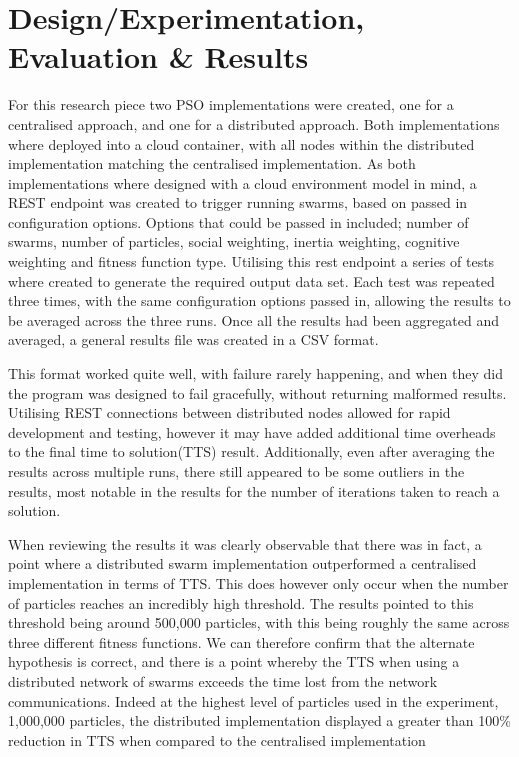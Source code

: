 \documentclass[oneside,12pt]{book}
\begin{document}
\section{Design/Experimentation, Evaluation \& Results}
For this research piece two PSO implementations were created, one for a centralised approach, and one for a distributed approach. Both implementations where deployed into a cloud container, with all nodes within the distributed implementation matching the centralised implementation. As both implementations where designed with a cloud environment model in mind, a REST endpoint was created to trigger running swarms, based on passed in configuration options. Options that could be passed in included; number of swarms, number of particles, social weighting, inertia weighting, cognitive weighting and fitness function type. Utilising this rest endpoint a series of tests where created to generate the required output data set. Each test was repeated three times, with the same configuration options passed in, allowing the results to be averaged across the three runs. 
Once all the results had been aggregated and averaged, a general results file was created in a CSV format. 

This format worked quite well, with failure rarely happening, and when they did the program was designed to fail gracefully, without returning malformed results. Utilising REST connections between distributed nodes allowed for rapid development and testing, however it may have added additional time overheads to the final time to solution(TTS) result. Additionally, even after averaging the results across multiple runs, there still appeared to be some outliers in the results, most notable in the results for the number of iterations taken to reach a solution. 

When reviewing the results it was clearly observable that there was in fact, a point where a distributed swarm implementation outperformed a centralised implementation in terms of TTS. This does however only occur when the number of particles reaches an incredibly high threshold. The results pointed to this threshold being around 500,000 particles, with this being roughly the same across three different fitness functions. We can therefore confirm that the alternate hypothesis is correct, and there is a point whereby the TTS when using a distributed network of swarms exceeds the time lost from the network communications. Indeed at the highest level of particles used in the experiment, 1,000,000 particles, the distributed implementation displayed a greater than 100\% reduction in TTS when compared to the centralised implementation
\end{document}
